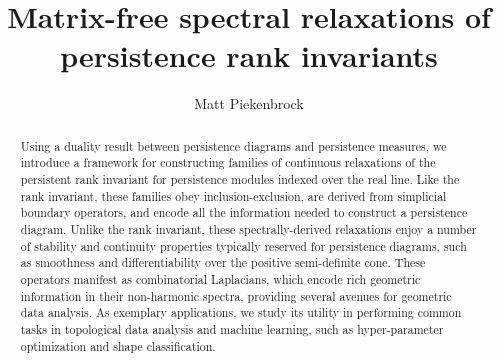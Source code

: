 \documentclass[10pt]{article}
\title{\vspace{-2.0em} 
Matrix-free spectral relaxations of \\ persistence rank invariants
\vspace{-0.5em}}
\author{Matt Piekenbrock}
\date{}
\numberwithin{equation}{section}
\newcommand{\+}{%
	\raisebox{0.18ex}{\scaleobj{0.55}{+}}
}
\theoremstyle{definition}
\theoremstyle{definition}
\begin{document}
\maketitle

\begin{abstract}
Using a duality result between persistence diagrams and persistence measures, we introduce a framework for constructing families of continuous relaxations of the persistent rank invariant for persistence modules indexed over the real line. 
Like the rank invariant, these families obey inclusion-exclusion, are derived from simplicial boundary operators, and encode all the information needed to construct a persistence diagram. 
Unlike the rank invariant, these spectrally-derived relaxations enjoy a number of stability and continuity properties typically reserved for persistence diagrams, such as smoothness and differentiability over the positive semi-definite cone. 
These operators manifest as combinatorial Laplacians, which encode rich geometric information in their non-harmonic spectra, providing several avenues for geometric data analysis. 
As exemplary applications, we study its utility in performing common tasks in topological data analysis and machine learning, such as hyper-parameter optimization and shape classification.

\end{abstract}
\end{document}

